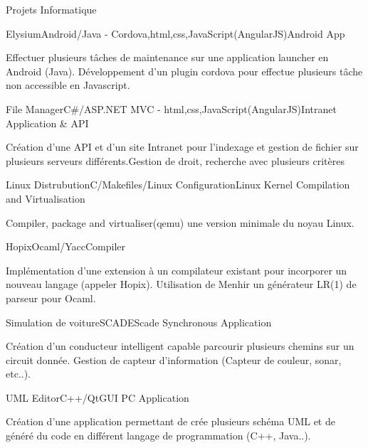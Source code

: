 \documentclass{resume} %
\begin{document}

\begin{rSection}{Projets Informatique}

\begin{rSubsection}{Elysium}{Android/Java - Cordova,html,css,JavaScript(AngularJS)}{Android App }{}
	\item Effectuer plusieurs tâches de maintenance sur une application launcher en Android (Java). Développement d'un plugin cordova pour effectue plusieurs tâche non accessible en Javascript.
\end{rSubsection}


\begin{rSubsection}{File Manager}{C\#/ASP.NET MVC - html,css,JavaScript(AngularJS)}{Intranet Application \& API}{}
	\item Création d'une API et d'un site Intranet pour l'indexage et gestion de fichier sur plusieurs serveurs différents.Gestion de droit, recherche avec plusieurs critères
\end{rSubsection}

\begin{rSubsection}{Linux Distrubution}{C/Makefiles/Linux Configuration}{Linux Kernel Compilation and Virtualisation}{}
	\item Compiler, package and virtualiser(qemu) une version minimale du noyau Linux. 
\end{rSubsection}

\begin{rSubsection}{Hopix}{Ocaml/Yacc}{Compiler}{}
	\item Implémentation d'une extension à un compilateur existant pour incorporer un nouveau langage (appeler Hopix). Utilisation de Menhir un générateur LR(1) de parseur pour Ocaml.
\end{rSubsection}

\begin{rSubsection}{Simulation de voiture}{SCADE}{Scade Synchronous Application}{}
	\item Création d'un conducteur intelligent capable parcourir plusieurs chemins sur un circuit donnée. Gestion de capteur d'information (Capteur de couleur, sonar, etc..).
\end{rSubsection}

\begin{rSubsection}{UML Editor}{C++/Qt}{GUI PC Application}{}
	\item Création d'une application permettant de crée plusieurs schéma UML et de généré du code en différent langage de programmation (C++, Java..).
\end{rSubsection}


\end{rSection}
\end{document}
